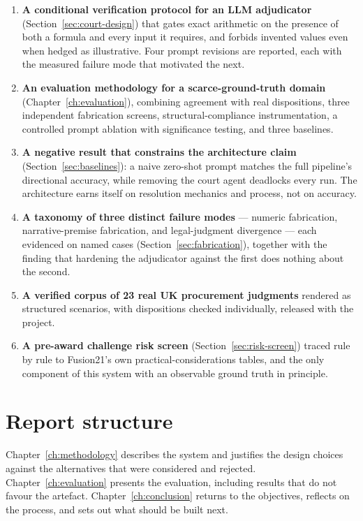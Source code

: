 \begin{enumerate}
  \item \textbf{A conditional verification protocol for an LLM adjudicator}
    (Section~\ref{sec:court-design}) that gates exact arithmetic on the presence
    of both a formula and every input it requires, and forbids invented values
    even when hedged as illustrative. Four prompt revisions are reported, each
    with the measured failure mode that motivated the next.
  \item \textbf{An evaluation methodology for a scarce-ground-truth domain}
    (Chapter~\ref{ch:evaluation}), combining agreement with real dispositions,
    three independent fabrication screens, structural-compliance instrumentation,
    a controlled prompt ablation with significance testing, and three baselines.
  \item \textbf{A negative result that constrains the architecture claim}
    (Section~\ref{sec:baselines}): a naive zero-shot prompt matches the full
    pipeline's directional accuracy, while removing the court agent deadlocks
    every run. The architecture earns itself on resolution mechanics and process,
    not on accuracy.
  \item \textbf{A taxonomy of three distinct failure modes} --- numeric
    fabrication, narrative-premise fabrication, and legal-judgment divergence ---
    each evidenced on named cases (Section~\ref{sec:fabrication}), together with
    the finding that hardening the adjudicator against the first does nothing
    about the second.
  \item \textbf{A verified corpus of 23 real UK procurement judgments} rendered
    as structured scenarios, with dispositions checked individually, released with
    the project.
  \item \textbf{A pre-award challenge risk screen} (Section~\ref{sec:risk-screen})
    traced rule by rule to Fusion21's own practical-considerations tables, and the
    only component of this system with an observable ground truth in principle.
\end{enumerate}

\section{Report structure}

Chapter~\ref{ch:methodology} describes the system and justifies the design
choices against the alternatives that were considered and rejected.
Chapter~\ref{ch:evaluation} presents the evaluation, including results that do
not favour the artefact. Chapter~\ref{ch:conclusion} returns to the objectives,
reflects on the process, and sets out what should be built next.
